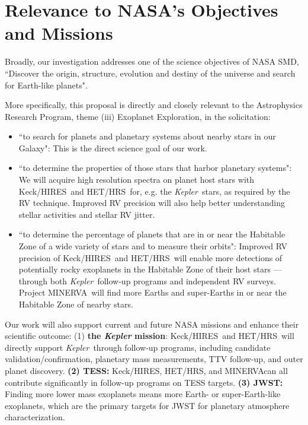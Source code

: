 \documentclass[12pt]{article}
\def\kepler{{\it Kepler}}
\def\minerva{MINERVA}
\def\hrs{HET/HRS}
\def\keck{Keck/HIRES}
\begin{document}
 
\vspace{-3pt}
\section{Relevance to NASA's Objectives and Missions}

Broadly, our investigation addresses one of the science
objectives of NASA SMD, ``Discover the origin, structure, evolution
and destiny of the universe and search for Earth-like planets".

More specifically, this proposal is directly and closely relevant to
the Astrophysics Research Program, theme (iii) Exoplanet Exploration,
in the solicitation:
\begin{itemize}[leftmargin=1.5em]
  \vspace{-3pt}
\item ``to search for planets and planetary systems about
  nearby stars in our Galaxy": This is the direct science goal of our
  work. 
  \vspace{-3pt}
\item ``to determine the properties of those stars that harbor
  planetary systems": We will acquire high resolution spectra on
  planet host stars with \keck\ and \hrs\ for, e.g. the
  \kepler\ stars, as required by the RV technique. Improved RV
  precision will also help better understanding stellar activities and
  stellar RV jitter.
  \vspace{-3pt}
\item ``to determine the percentage of planets that are in or near the
  Habitable Zone of a wide variety of stars and to measure their
  orbits": Improved RV precision of \keck\ and \hrs\ will enable more
  detections of potentially rocky exoplanets in the Habitable Zone of
  their host stars --- through both \kepler\ follow-up programs and
  independent RV surveys. Project \minerva\ will find more Earths and
  super-Earths in or near the Habitable Zone of nearby stars.
  \vspace{-3pt}
\end{itemize}

Our work will also support current and future NASA missions and
enhance their scientific outcome: (1) {\bf the \textit{Kepler}
  mission}: \keck\ and \hrs\ will directly support \kepler\ through
follow-up programs, including candidate validation/confirmation,
planetary mass measurements, TTV follow-up, and outer planet
discovery. {\bf (2) TESS:} \keck, \hrs, and \minerva can all
contribute significantly in follow-up programs on TESS targets. {\bf
  (3) JWST:} Finding more lower mass exoplanets means more Earth- or
super-Earth-like exoplanets, which are the primary targets for JWST
for planetary atmosphere characterization.



\vspace{-3pt}
{\small %
 }
\end{document}
